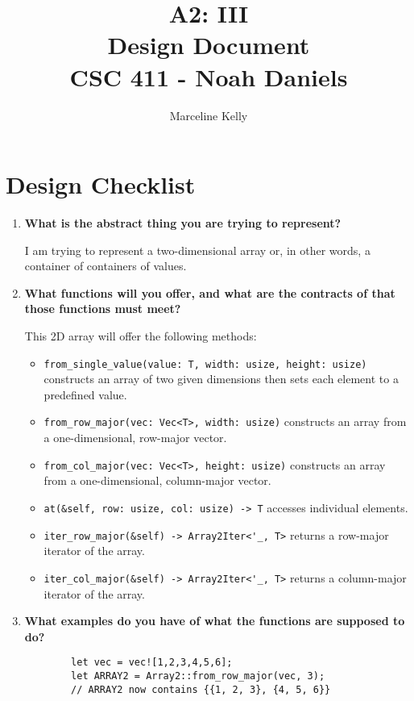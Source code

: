 \documentclass[12pt, letterpaper]{article}
\title{A2: III \\
    \large Design Document \\
    CSC 411 - Noah Daniels}
\author{Marceline Kelly}
\begin{document}
\maketitle

\section*{Design Checklist}

\begin{enumerate}
    \item \textbf{What is the abstract thing you are trying to represent?}

    I am trying to represent a two-dimensional array or, in other words, a container of containers of values.

    \item \textbf{What functions will you offer, and what are the contracts of that those
    functions must meet?}

    This 2D array will offer the following methods:

    \begin{itemize}
        \item \verb|from_single_value(value: T, width: usize, height: usize)| constructs an array of two given dimensions then sets each element to a predefined value.
        \item \verb|from_row_major(vec: Vec<T>, width: usize)| constructs an array from a one-dimensional, row-major vector.
        \item \verb|from_col_major(vec: Vec<T>, height: usize)| constructs an array from a one-dimensional, column-major vector.
        \item \verb|at(&self, row: usize, col: usize) -> T| accesses individual elements.
        \item \verb|iter_row_major(&self) -> Array2Iter<'_, T>| returns a row-major iterator of the array.
        \item \verb|iter_col_major(&self) -> Array2Iter<'_, T>| returns a column-major iterator of the array.
    \end{itemize}

    \item \textbf{What examples do you have of what the functions are supposed to do?}
    
    \begin{verbatim}
        let vec = vec![1,2,3,4,5,6];
        let ARRAY2 = Array2::from_row_major(vec, 3);
        // ARRAY2 now contains {{1, 2, 3}, {4, 5, 6}}


\end{verbatim}
\end{enumerate}
\end{document}
